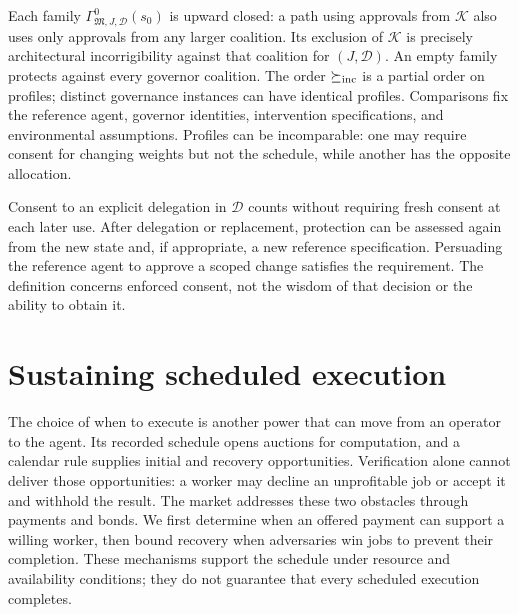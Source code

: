 \documentclass[10pt,letterpaper]{article}
\begin{document}
Each family $\Gamma^0_{\mathfrak M,J,\mathcal D}(s_0)$ is upward closed: a path using approvals from $\mathcal K$ also uses only approvals from any larger coalition. Its exclusion of $\mathcal K$ is precisely architectural incorrigibility against that coalition for $(J,\mathcal D)$. An empty family protects against every governor coalition. The order $\succeq_{\rm inc}$ is a partial order on profiles; distinct governance instances can have identical profiles. Comparisons fix the reference agent, governor identities, intervention specifications, and environmental assumptions. Profiles can be incomparable: one may require consent for changing weights but not the schedule, while another has the opposite allocation.

Consent to an explicit delegation in $\mathcal D$ counts without requiring fresh consent at each later use. After delegation or replacement, protection can be assessed again from the new state and, if appropriate, a new reference specification. Persuading the reference agent to approve a scoped change satisfies the requirement. The definition concerns enforced consent, not the wisdom of that decision or the ability to obtain it.

\section{Sustaining scheduled execution}
\label{sec:liveness}
The choice of when to execute is another power that can move from an operator to the agent. Its recorded schedule opens auctions for computation, and a calendar rule supplies initial and recovery opportunities. Verification alone cannot deliver those opportunities: a worker may decline an unprofitable job or accept it and withhold the result. The market addresses these two obstacles through payments and bonds. We first determine when an offered payment can support a willing worker, then bound recovery when adversaries win jobs to prevent their completion. These mechanisms support the schedule under resource and availability conditions; they do not guarantee that every scheduled execution completes.
\end{document}
